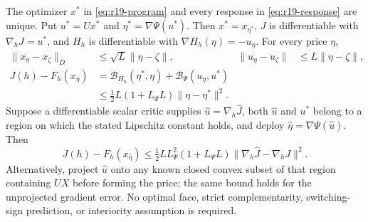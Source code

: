 \begin{theorem}\label{thm:r19-global}
The optimizer $x^*$ in \eqref{eq:r19-program} and every response in \eqref{eq:r19-response} are unique. Put $u^*=Ux^*$ and $\eta^*=\nabla\Psi(u^*)$. Then $x^*=x_{\eta^*}$, $J$ is differentiable with $\nabla_hJ=u^*$, and $H_h$ is differentiable with $\nabla H_h(\eta)=-u_\eta$. For every price $\eta$,
\begin{align}
 \|x_\eta-x_\zeta\|_D&\leq\sqrt L\|\eta-\zeta\|,
 &\|u_\eta-u_\zeta\|&\leq L\|\eta-\zeta\|,\label{eq:r19-lipschitz}\\
 J(h)-F_h(x_\eta)
 &=\mathcal B_{H_h}(\eta^*,\eta)+\mathcal B_\Psi(u_\eta,u^*)\label{eq:r19-identity}\\
 &\leq\tfrac12L(1+L_\Psi L)\|\eta-\eta^*\|^2.\label{eq:r19-pricebound}
\end{align}
Suppose a differentiable scalar critic supplies $\widehat u=\nabla_h\widehat J$, both $\widehat u$ and $u^*$ belong to a region on which the stated Lipschitz constant holds, and deploy $\widehat\eta=\nabla\Psi(\widehat u)$. Then
\begin{equation}\label{eq:r19-gradientbound}
 J(h)-F_h(x_{\widehat\eta})
 \leq\tfrac12L L_\Psi^2(1+L_\Psi L)
              \|\nabla_h\widehat J-\nabla_hJ\|^2.
\end{equation}
Alternatively, project $\widehat u$ onto any known closed convex subset of that region containing $UX$ before forming the price; the same bound holds for the unprojected gradient error. No optimal face, strict complementarity, switching-sign prediction, or interiority assumption is required.
\end{theorem}
